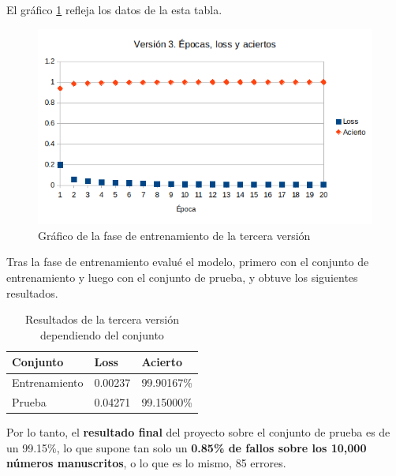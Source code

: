 \bigskip

El gráfico \ref{fig:res-v3} refleja los datos de la esta tabla.

\bigskip

\begin{figure}[H]
  \centering
  \includegraphics[width=1\textwidth]{../images/results-v3}
  \caption{Gráfico de la fase de entrenamiento de la tercera versión}
  \label{fig:res-v3}
\end{figure}

\bigskip

Tras la fase de entrenamiento evalué el modelo, primero con el conjunto de entrenamiento y luego con el conjunto de prueba, y obtuve los siguientes resultados.

\bigskip

\begin{table}[H]
  \centering
  \begin{tabular}{|l|l|l|}
    \hline
    \textbf{Conjunto} & \textbf{Loss} & \textbf{Acierto} \\
    \hline
    Entrenamiento & 0.00237 & 99.90167\%  \\
    Prueba        & 0.04271 & 99.15000\%  \\
    \hline
  \end{tabular}
  \label{tab:results-v3}
  \caption{Resultados de la tercera versión dependiendo del conjunto}
\end{table}

\bigskip

Por lo tanto, el \textbf{resultado final} del proyecto sobre el conjunto de prueba es de un 99.15\%, lo que supone tan solo un \textbf{0.85\% de fallos sobre los 10,000 números manuscritos}, o lo que es lo mismo, 85 errores.
